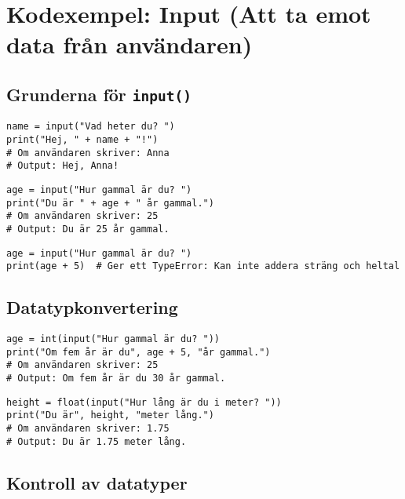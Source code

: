 \section{Kodexempel: Input (Att ta emot data från användaren)}
\label{examples:input}
\subsection*{Grunderna för \texttt{input()}}

\begin{lstlisting}[title=Exempel 1: Läsa in text från användaren]
name = input("Vad heter du? ")
print("Hej, " + name + "!")
# Om användaren skriver: Anna
# Output: Hej, Anna!
\end{lstlisting}

\begin{lstlisting}[title=Exempel 2: Mata in ett heltal]
age = input("Hur gammal är du? ")
print("Du är " + age + " år gammal.")
# Om användaren skriver: 25
# Output: Du är 25 år gammal.
\end{lstlisting}

\begin{lstlisting}[title=Exempel 3: Fel vid aritmetiska operationer utan typkonvertering]
age = input("Hur gammal är du? ")
print(age + 5)  # Ger ett TypeError: Kan inte addera sträng och heltal
\end{lstlisting}

\subsection*{Datatypkonvertering}

\begin{lstlisting}[title=Exempel 4: Konvertera input till ett heltal]
age = int(input("Hur gammal är du? "))
print("Om fem år är du", age + 5, "år gammal.")
# Om användaren skriver: 25
# Output: Om fem år är du 30 år gammal.
\end{lstlisting}

\begin{lstlisting}[title=Exempel 5: Konvertera input till ett flyttal]
height = float(input("Hur lång är du i meter? "))
print("Du är", height, "meter lång.")
# Om användaren skriver: 1.75
# Output: Du är 1.75 meter lång.
\end{lstlisting}

\subsection*{Kontroll av datatyper}

